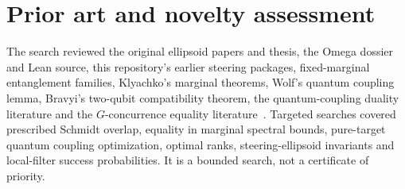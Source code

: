 \documentclass[11pt,a4paper]{article}
\theoremstyle{remark}\newtheorem{remark}[theorem]{Remark}
\begin{document}















\section{Prior art and novelty assessment}\label{sec:novelty}
The search reviewed the original ellipsoid papers and thesis, the Omega
dossier and Lean source, this repository's earlier steering packages,
fixed-marginal entanglement families, Klyachko's marginal theorems, Wolf's
quantum coupling lemma, Bravyi's two-qubit compatibility theorem, the
quantum-coupling duality literature and the $G$-concurrence equality
literature~\cite{milne2014,milnegeometry,thesis,publicproof,steeringbounds,jointrange,adesso,baio,klyachko,wolf,bravyi,cole2023,capacity2025,gourguo,zhu}.
Targeted searches covered prescribed Schmidt overlap, equality in marginal
spectral bounds, pure-target quantum coupling optimization, optimal ranks,
steering-ellipsoid invariants and local-filter success probabilities. It is a
bounded search, not a certificate of priority.
\end{document}
